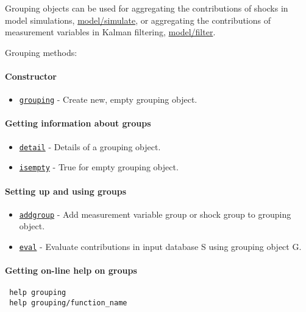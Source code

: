 

	Grouping objects can be used for aggregating the contributions of shocks
 in model simulations, \url{model/simulate}, or aggregating the
 contributions of measurement variables in Kalman filtering,
 \url{model/filter}.
 
 Grouping methods:
 
 \paragraph{Constructor}
 
 \begin{itemize}
 \item
   \href{grouping/grouping}{\texttt{grouping}} - Create new, empty
   grouping object.
 \end{itemize}
 
 \paragraph{Getting information about groups}
 
 \begin{itemize}
 \item
   \href{grouping/detail}{\texttt{detail}} - Details of a grouping
   object.
 \item
   \href{grouping/isempty}{\texttt{isempty}} - True for empty grouping
   object.
 \end{itemize}
 
 \paragraph{Setting up and using groups}
 
 \begin{itemize}
 \item
   \href{grouping/addgroup}{\texttt{addgroup}} - Add measurement variable
   group or shock group to grouping object.
 \item
   \href{grouping/eval}{\texttt{eval}} - Evaluate contributions in input
   database S using grouping object G.
 \end{itemize}
 
 \paragraph{Getting on-line help on groups}
 
 \begin{verbatim}
 help grouping
 help grouping/function_name
 \end{verbatim}



